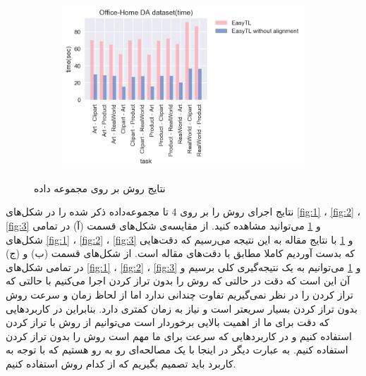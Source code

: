 \begin{figure}
\begin{subfigure}[b]{0.35\textwidth}
		\includegraphics[width=\linewidth]{images/4_3.jpg}
		\caption{}
	\end{subfigure}%
	\caption{
		نتایج روش
		بر روی مجموعه داده
		\textit{}
	}
	\label{fig:4}
\end{figure}

نتایج اجرای روش
را بر روی 4 تا مجموعه‌داده ذکر شده را در شکل‌های
\ref{fig:1}
،
\ref{fig:2}
،
\ref{fig:3}
و
\ref{fig:4}
می‌توانید مشاهده کنید. از مقایسه‌ی شکل‌های قسمت (آ) در تمامی شکل‌های 
\ref{fig:1}
،
\ref{fig:2}
،
\ref{fig:3}
و
\ref{fig:4}
 با نتایج مقاله به این نتیجه می‌رسیم که دقت‌هایی که بدست آوردیم کاملا مطابق با دقت‌های مقاله است. از شکل‌های قسمت (ب) و (ج) در تمامی شکل‌های
\ref{fig:1}
،
\ref{fig:2}
،
\ref{fig:3}
و
\ref{fig:4}
می‌توانیم به یک نتیجه‌گیری کلی برسیم و آن این است که دقت در حالتی که روش 
 را بدون تراز کردن اجرا می‌کنیم با حالتی که تراز کردن را در نظر نمی‌گیریم تفاوت چندانی ندارد اما از لحاظ زمان و سرعت روش 
 بدون تراز کردن بسیار سریعتر است و نیاز به زمان کمتری دارد. بنابراین در کاربردهایی که دقت برای ما از اهمیت بالایی برخوردار است می‌توانیم از روش 
 با تراز کردن استفاده کنیم و در کاربردهایی که سرعت برای ما مهم است روش 
  را بدون تراز کردن استفاده کنیم. به عبارت دیگر در اینجا با یک مصالحه‌ای رو به رو هستیم که با توجه به کاربرد باید تصمیم بگیریم که از کدام روش استفاده کنیم. 
  
  